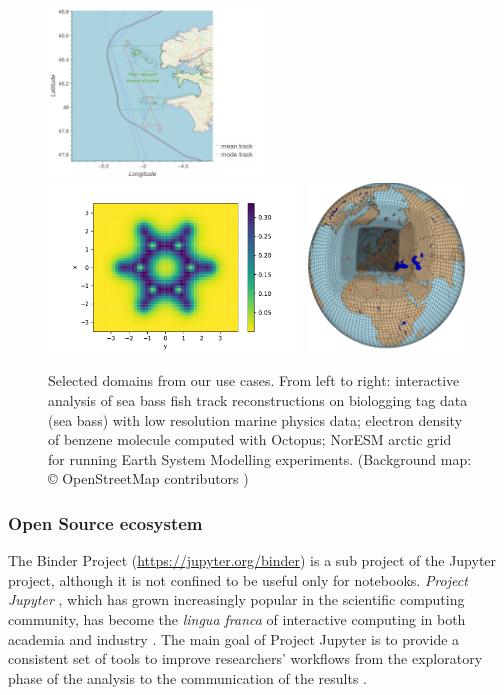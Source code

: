 \begin{figure}
  \includegraphics[height=4.5cm]{images/fish.png}\hfill
  \includegraphics[height=4.5cm]{images/octopus-benzene.pdf}\hfill
  \includegraphics[height=4.5cm]{images/gg-a.png}
  \caption{Selected domains from our use cases. From left to right: interactive
    analysis of sea bass fish track reconstructions on biologging tag data (sea bass)
    with low resolution marine physics data; electron
    density of benzene molecule computed with Octopus; NorESM arctic grid for running Earth System Modelling experiments.
    (Background map: \copyright
    OpenStreetMap contributors ) \label{fig:applications}}
\end{figure}

\subsubsection{Open Source ecosystem}\label{sec:opensource}


The Binder Project \cite{binder} (\url{https://jupyter.org/binder}) is
a sub project of the Jupyter project, although it is not confined to be
useful only for notebooks.
\emph{Project Jupyter} \cite{Jupyter}, which has grown increasingly popular in the scientific
computing community, has become the \emph{lingua franca} of interactive
computing in both academia and industry \cite{Perkel2018}. The main goal of Project Jupyter
is to provide a consistent set of tools to improve researchers'
workflows from the exploratory phase of the analysis to the communication
of the results \cite{Kluyver2016,Granger2021}.


